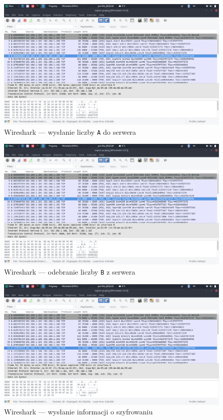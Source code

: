 \documentclass[a4paper]{article}
\begin{document}
\begin{figure}[H]
	\center
\includegraphics[width=.8\textwidth]{img/4-a.png}
\caption{Wireshark --- wysłanie liczby \texttt{A} do serwera}
\end{figure}

\begin{figure}[H]
	\center
\includegraphics[width=.8\textwidth]{img/5-b.png}
\caption{Wireshark --- odebranie liczby \texttt{B} z serwera}
\end{figure}

\begin{figure}[H]
	\center
\includegraphics[width=.8\textwidth]{img/6-enc.png}
\caption{Wireshark --- wysłanie informacji o szyfrowaniu}
\end{figure}
\end{document}
